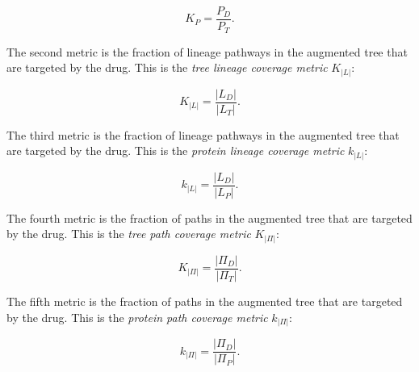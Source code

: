 \documentclass{article}
\newcounter{ctr}
\begin{document}
\begin{equation}
K_P = \frac{P_D}{P_T}.
\end{equation}

The second metric is the fraction of lineage pathways in the augmented tree that are targeted by the drug. This is the \textit{tree lineage coverage metric} $K_|L|$:

\begin{equation}
K_{|L|} = \frac{|L_D|}{|L_T|}.
\end{equation}

The third metric is the fraction of lineage pathways in the augmented tree that are targeted by the drug. This is the \textit{protein lineage coverage metric} $k_|L|$:

\begin{equation}
k_{|L|} = \frac{|L_D|}{|L_P|}.
\end{equation}

The fourth metric is the fraction of paths in the augmented tree that are targeted by the drug. This is the \textit{tree path coverage metric} $K_|\Pi|$:

\begin{equation}
K_{|\Pi|} = \frac{|\Pi_D|}{|\Pi_T|}.
\end{equation}

The fifth metric is the fraction of paths in the augmented tree that are targeted by the drug. This is the \textit{protein path coverage metric} $k_|\Pi|$:

\begin{equation}
k_{|\Pi|} = \frac{|\Pi_D|}{|\Pi_P|}.
\end{equation}

\setcounter{ctr_0}{26}

\newcommand{\vAA}{protein_0_fraction_val\the\numexpr\value{ctr_0}\relax}
\newcommand{\vAB}{protein_1_fraction_val\the\numexpr\value{ctr_0}\relax}
\newcommand{\vAC}{protein_2_fraction_val\the\numexpr\value{ctr_0}\relax}

\newcommand{\vBA}{augmented_lattice_complexity_metrics_P\the\numexpr\value{ctr_0}\relax}
\newcommand{\vBB}{drug_0_lattice_complexity_metrics_P\the\numexpr\value{ctr_0}\relax}
\newcommand{\vBC}{drug_1_lattice_complexity_metrics_P\the\numexpr\value{ctr_0}\relax}
\newcommand{\vBD}{drug_2_lattice_complexity_metrics_P\the\numexpr\value{ctr_0}\relax}

\newcommand{\vCA}{augmented_lattice_complexity_metrics_|L|\the\numexpr\value{ctr_0}\relax}
\newcommand{\vCB}{protein_lattice_complexity_metrics_|L|\the\numexpr\value{ctr_0}\relax}
\newcommand{\vCC}{drug_0_lattice_complexity_metrics_|L|\the\numexpr\value{ctr_0}\relax}
\newcommand{\vCD}{drug_1_lattice_complexity_metrics_|L|\the\numexpr\value{ctr_0}\relax}
\newcommand{\vCE}{drug_2_lattice_complexity_metrics_|L|\the\numexpr\value{ctr_0}\relax}
\end{document}
